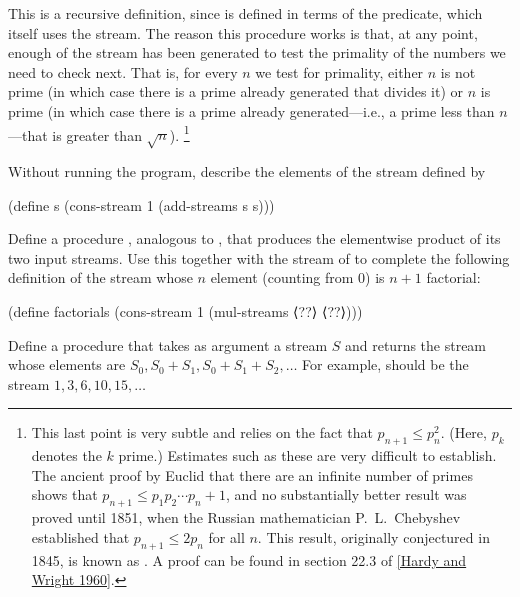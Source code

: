 This is a recursive definition, since  is defined in terms of the  predicate, which itself uses the  stream.
The reason this procedure works is that, at any point, enough of the  stream has been generated to test the primality of the numbers we need to check next.
That is, for every \( n \) we test for primality, either \( n \) is not prime (in which case there is a prime already generated that divides it) or \( n \) is prime (in which case there is a prime already generated---i.e., a prime less than \( n \)---that is greater than \( \sqrt{n} \)).%
\footnote{
	This last point is very subtle and relies on the fact that \( p_{n+1} ≤ p_n^2 \).
	(Here, \( p_k \) denotes the \( k \) prime.)
	Estimates such as these are very difficult to establish.
	The ancient proof by Euclid that there are an infinite number of primes shows that \( p_{n+1} ≤ p_1 p_2 \dotsm p_n + 1 \), and no substantially better result was proved until 1851, when the Russian mathematician P.~L.~Chebyshev established that \( p_{n+1} ≤ 2 p_n \) for all \( n \).
	This result, originally conjectured in 1845, is known as .
	A proof can be found in section 22.3 of \cref{Hardy and Wright 1960}.
}



\begin{exercise}
	\label{Exercise 3.53}
	Without running the program, describe the elements of the stream defined by
	\begin{scheme}
	  (define s (cons-stream 1 (add-streams s s)))
	\end{scheme}
\end{exercise}



\begin{exercise}
	\label{Exercise 3.54}
	Define a procedure , analogous to , that produces the elementwise product of its two input streams.
	Use this together with the stream of  to complete the following definition of the stream whose \( n \) element (counting from \( 0 \)) is \( n + 1 \) factorial:
	\begin{scheme}
	  (define factorials
	    (cons-stream 1 (mul-streams ⟨??⟩ ⟨??⟩)))
	\end{scheme}
\end{exercise}



\begin{exercise}
	\label{Exercise 3.55}
	Define a procedure  that takes as argument a stream \( S \) and returns the stream whose elements are \( S_0, S_0 + S_1, S_0 + S_1 + S_2, \dotsc \)
	For example,  should be the stream \( 1, 3, 6, 10, 15, \dotsc \)
\end{exercise}




